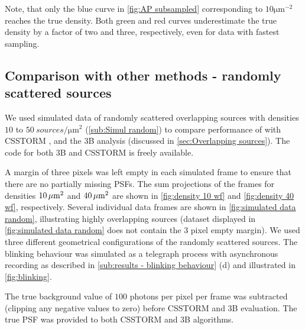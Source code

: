 Note, that only the blue curve in \autoref{fig:AP subsampled}\aaa{} corresponding to $10\unit{\um}^{-2}$ reaches the true density. Both green and red curves underestimate the true density by a factor of two and three, respectively, even for data with fastest sampling. 



\subsection{Comparison with other methods - randomly scattered sources\label{sub:results - comparison}} %
We used simulated data of randomly scattered overlapping sources with densities $10$ to $50\ \unit{sources/\um^2}$ (\autoref{sub:Simul random}) to compare performance of \inmf{} with CSSTORM \cite{Zhu2012}, and the 3B analysis \cite{Cox2011} (discussed in \autoref{sec:Overlapping sources}). The code for both 3B and CSSTORM is freely available.  

A margin of three pixels was left empty in each simulated frame to ensure that there are no partially missing PSFs. The sum projections of the frames for densities $10 \, \mathrm{\mu m}^2$ and $40 \, \mathrm{\mu m}^2$ are shown in \autoref{fig:density 10 wf} and \ref{fig:density 40 wf}, respectively. Several individual data frames are shown in \autoref{fig:simulated data random}, illustrating highly overlapping sources (dataset displayed in \autoref{fig:simulated data random} does not contain the 3 pixel empty margin). We used three different geometrical configurations of the randomly scattered sources. The blinking behaviour was simulated as a telegraph process with asynchronous recording as described in \autoref{sub:results - blinking behaviour} (d) and illustrated in \autoref{fig:blinking}\ddd.

The true background value of $100$ photons per pixel per frame was subtracted (clipping any negative values to zero) before CSSTORM and 3B evaluation. The true PSF was provided to both CSSTORM and 3B algorithms. 

